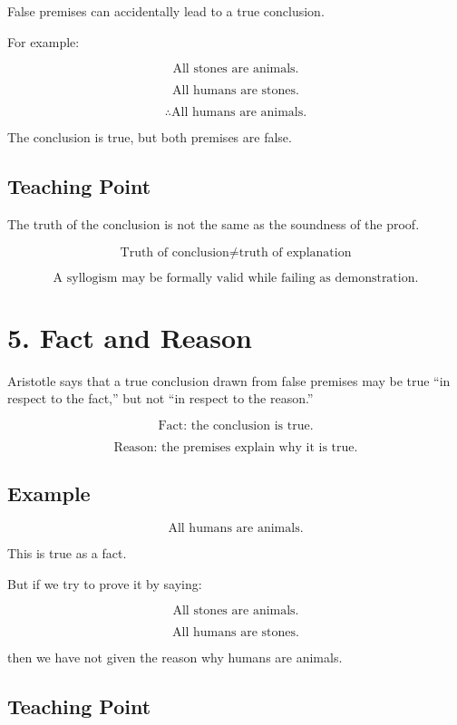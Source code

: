 \documentclass[12pt]{article}
\begin{document}
False premises can accidentally lead to a true conclusion.

For example:

\[
\text{All stones are animals.}
\]

\[
\text{All humans are stones.}
\]

\[
\therefore \text{All humans are animals.}
\]

The conclusion is true, but both premises are false.

\subsection*{Teaching Point}

The truth of the conclusion is not the same as the soundness of the proof.

\[
\boxed{
\text{Truth of conclusion} \neq \text{truth of explanation}
}
\]

\[
\boxed{
\text{A syllogism may be formally valid while failing as demonstration.}
}
\]

\section*{5. Fact and Reason}

Aristotle says that a true conclusion drawn from false premises may be true
``in respect to the fact,'' but not ``in respect to the reason.''

\[
\text{Fact: the conclusion is true.}
\]

\[
\text{Reason: the premises explain why it is true.}
\]

\subsection*{Example}

\[
\text{All humans are animals.}
\]

This is true as a fact.

But if we try to prove it by saying:

\[
\text{All stones are animals.}
\]

\[
\text{All humans are stones.}
\]

then we have not given the reason why humans are animals.

\subsection*{Teaching Point}
\end{document}
